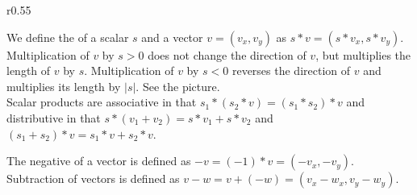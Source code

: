 \documentclass[12pt]{article}
\begin{document}
\bigskip

\begin{minipage}{\textwidth}\raggedright
\begin{wrapfigure}{r}{0.55\textwidth}
\end{wrapfigure}
We define the  of a scalar $s$ and a vector
$v=(v_x,v_y)$ as $s*v = (s*v_x,s*v_y)$.  Multiplication
of $v$ by $s>0$ does not change the direction of $v$,
but multiplies the length of $v$ by $s$.  Multiplication of $v$ by
$s<0$ reverses the direction of $v$ and multiplies its length
by $|s|$.  See the picture.
\\[1ex]
Scalar products are associative in that
$s_1*(s_2*v)=(s_1*s_2)*v$ and distributive in that
$s*(v_1+v_2)=s*v_1+s*v_2$ and $(s_1+s_2)*v = s_1*v + s_2*v$.
\end{minipage}

\medskip

The negative of a vector is defined as $-v = (-1)*v = (-v_x,-v_y)$.
Subtraction of vectors is defined as $v-w = v + (-w) = (v_x-w_x,v_y-w_y)$. 

\medskip
\end{document}
